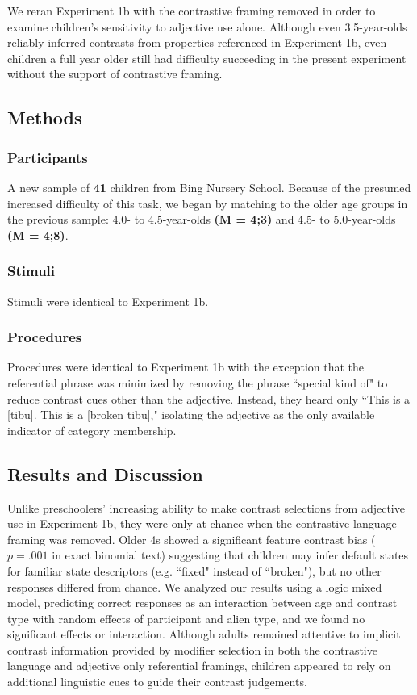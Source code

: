 \documentclass[10pt,letterpaper]{article}
\begin{document}
We reran Experiment 1b with the contrastive framing removed in order to examine children's sensitivity to adjective use alone. Although even 3.5-year-olds reliably inferred contrasts from properties referenced in Experiment 1b, even children a full year older still had difficulty succeeding in the present experiment without the support of contrastive framing.  

\subsection{Methods}

\subsubsection{Participants}

A new sample of \textbf{41} children from Bing Nursery School.  Because of the presumed increased difficulty of this task, we began by matching to the older age groups in the previous sample: 4.0- to 4.5-year-olds \textbf{(M = 4;3)} and 4.5- to 5.0-year-olds \textbf{(M = 4;8)}.

\subsubsection{Stimuli}

Stimuli were identical to Experiment 1b. 

\subsubsection{Procedures}

Procedures were identical to Experiment 1b with the exception that the referential phrase was minimized by removing the phrase ``special kind of" to reduce contrast cues other than the adjective.  Instead, they heard only ``This is a [tibu]. This is a [broken tibu]," isolating the adjective as the only available indicator of category membership.

\subsection{Results and Discussion}

Unlike preschoolers' increasing ability to make contrast selections from adjective use in Experiment 1b, they were only at chance when the contrastive language framing was removed.  Older 4s showed a significant feature contrast bias ($p  = .001$ in exact binomial text) suggesting that children may infer default states for familiar state descriptors (e.g. ``fixed" instead of ``broken"), but no other responses differed from chance.  We analyzed our results using a logic mixed model, predicting correct responses as an interaction between age and contrast type with random effects of participant and alien type, and we found no significant effects or interaction.  Although adults remained attentive to implicit contrast information provided by modifier selection in both the contrastive language and adjective only referential framings, children appeared to rely on additional linguistic cues to guide their contrast judgements.  
\end{document}
